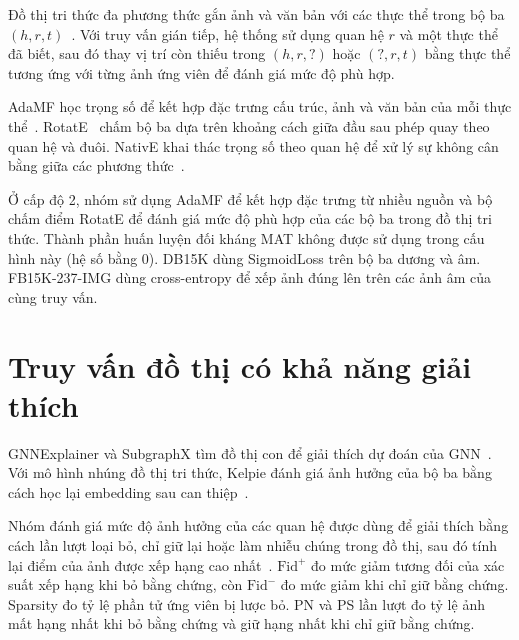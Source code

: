 Đồ thị tri thức đa phương thức gắn ảnh và văn bản với các thực thể trong bộ ba $(h,r,t)$~\cite{liu2019mmkg}. Với truy vấn gián tiếp, hệ thống sử dụng quan hệ $r$ và một thực thể đã biết, sau đó thay vị trí còn thiếu trong $(h,r,?)$ hoặc $(?,r,t)$ bằng thực thể tương ứng với từng ảnh ứng viên để đánh giá mức độ phù hợp.

AdaMF học trọng số để kết hợp đặc trưng cấu trúc, ảnh và văn bản của mỗi thực thể~\cite{adamfmat2024}. RotatE~\cite{sun2019rotate} chấm bộ ba dựa trên khoảng cách giữa đầu sau phép quay theo quan hệ và đuôi. NativE khai thác trọng số theo quan hệ để xử lý sự không cân bằng giữa các phương thức~\cite{native2024sigir}.

Ở cấp độ 2, nhóm sử dụng AdaMF để kết hợp đặc trưng từ nhiều nguồn và bộ chấm điểm RotatE để đánh giá mức độ phù hợp của các bộ ba trong đồ thị tri thức. Thành phần huấn luyện đối kháng MAT không được sử dụng trong cấu hình này (hệ số bằng 0). DB15K dùng SigmoidLoss trên bộ ba dương và âm. FB15K-237-IMG dùng cross-entropy để xếp ảnh đúng lên trên các ảnh âm của cùng truy vấn.

\section{Truy vấn đồ thị có khả năng giải thích}
\label{sec:explainable-retrieval}

GNNExplainer và SubgraphX tìm đồ thị con để giải thích dự đoán của GNN~\cite{ying2019gnnexplainer,yuan2021subgraphx}. Với mô hình nhúng đồ thị tri thức, Kelpie đánh giá ảnh hưởng của bộ ba bằng cách học lại embedding sau can thiệp~\cite{rossi2022kelpie}.

Nhóm đánh giá mức độ ảnh hưởng của các quan hệ được dùng để giải thích bằng cách lần lượt loại bỏ, chỉ giữ lại hoặc làm nhiễu chúng trong đồ thị, sau đó tính lại điểm của ảnh được xếp hạng cao nhất~\cite{amara2022graphframex}. $\mathrm{Fid}^{+}$ đo mức giảm tương đối của xác suất xếp hạng khi bỏ bằng chứng, còn $\mathrm{Fid}^{-}$ đo mức giảm khi chỉ giữ bằng chứng. Sparsity đo tỷ lệ phần tử ứng viên bị lược bỏ. PN và PS lần lượt đo tỷ lệ ảnh mất hạng nhất khi bỏ bằng chứng và giữ hạng nhất khi chỉ giữ bằng chứng.
